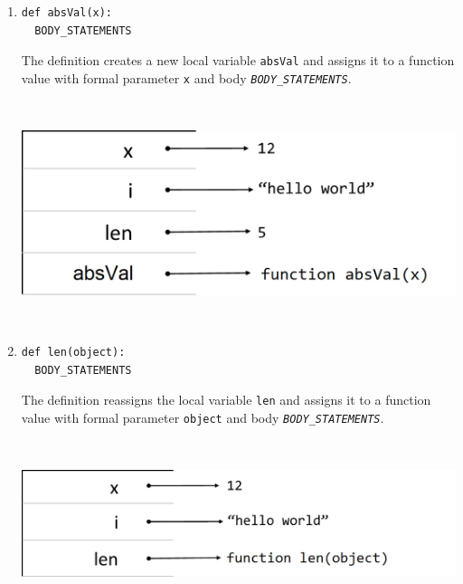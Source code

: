 \documentclass{article}
\newcommand{\expr}[1]{\texttt{#1}}
\newcommand{\mvar}[1]{\expr{\emph{\uppercase{#1}}}}
\newcommand{\pretabularspace}{\ifhevea\else \strut \\ \strut \fi}
\newcommand{\posttabularspace}{\ifhevea\else \strut \\ \strut \fi}
\begin{document}
  \begin{enumerate}
    \item
\begin{verbatim}
def absVal(x):
  BODY_STATEMENTS
\end{verbatim}
    The definition creates a new local variable \expr{absVal} and assigns it to a function value with formal parameter \expr{x} and body \mvar{BODY\_STATEMENTS}.
    \pretabularspace
    \includegraphics[scale=0.35]{diagrams/bindings-3-1}
    \posttabularspace

%

    \item
\begin{verbatim}
def len(object):
  BODY_STATEMENTS
\end{verbatim}
    The definition reassigns the local variable \expr{len} and assigns it to a function value with formal parameter \expr{object} and body \mvar{BODY\_STATEMENTS}.
    \pretabularspace
    \includegraphics[scale=0.35]{diagrams/bindings-3-4}
    \posttabularspace
  \end{enumerate}
\end{document}
